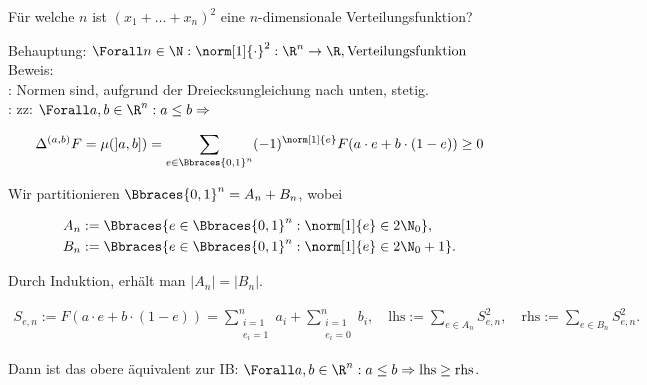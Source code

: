 
\begin{exercise}

Für welche $n$ ist $(x_1 + \ldots + x_n)^2$ eine $n$-dimensionale Verteilungsfunktion?

\end{exercise}


\begin{solution}

Behauptung: $\Forall n \in \N: \norm[1]{\cdot}^2: \R^n \to \R, \text{Verteilungsfunktion}$ \\

Beweis: \\

: Normen sind, aufgrund der Dreiecksungleichung nach unten, stetig. \\

: zz: $\Forall a, b \in \R^n: a \leq b \Rightarrow$

\begin{align*}
  \Delta^{(a, b)} F
  =
  \mu(]a, b])
  =
  \sum_{e \in \Bbraces{0, 1}^n}
  (-1)^{\norm[1]{e}}
  F(a \cdot e + b \cdot (1 - e)) \geq 0
\end{align*}

Wir partitionieren $\Bbraces{0, 1}^n = A_n + B_n$, wobei

\begin{align*}
  A_n & := \Bbraces{e \in \Bbraces{0, 1}^n: \norm[1]{e} \in 2 \N_0}, \\
  B_n & := \Bbraces{e \in \Bbraces{0, 1}^n: \norm[1]{e} \in 2 \N_0 + 1}.
\end{align*}

Durch Induktion, erhält man $|A_n| = |B_n|$.

\begin{align*}
  S_{e, n}
  :=
  F(a \cdot e + b \cdot (1 - e))
  =
  \sum_{\substack{i = 1 \\ e_i = 1}}^n a_i +
  \sum_{\substack{i = 1 \\ e_i = 0}}^n b_i,
  \quad
  \text{lhs} := \sum_{e \in A_n} S_{e, n}^2,
  \quad
  \text{rhs} := \sum_{e \in B_n} S_{e, n}^2.
\end{align*}

Dann ist das obere  äquivalent zur IB: $\Forall a, b \in \R^n: a \leq b \Rightarrow \text{lhs} \geq \text{rhs}$. \\


\end{solution}
